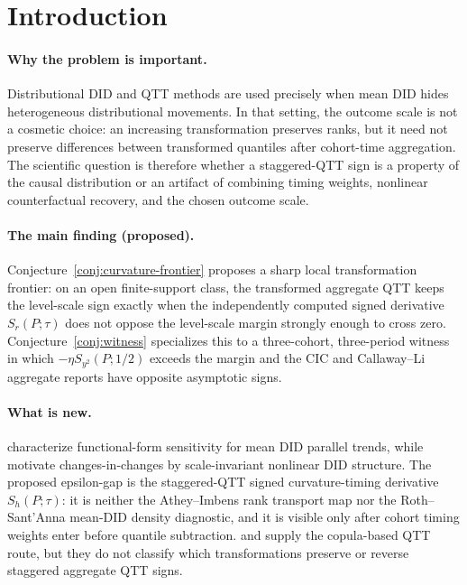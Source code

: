 \documentclass[11pt]{article}
\theoremstyle{definition}
\theoremstyle{plain}
\theoremstyle{remark}
\begin{document}
\section{Introduction}
\paragraph{Why the problem is important.}
Distributional DID and QTT methods are used precisely when mean DID hides
heterogeneous distributional movements.  In that setting, the outcome scale is not
a cosmetic choice: an increasing transformation preserves ranks, but it need not
preserve differences between transformed quantiles after cohort-time aggregation.
The scientific question is therefore whether a staggered-QTT sign is a property of
the causal distribution or an artifact of combining timing weights, nonlinear
counterfactual recovery, and the chosen outcome scale.

\paragraph{The main finding (proposed).}
Conjecture~\ref{conj:curvature-frontier} proposes a sharp local transformation
frontier: on an open finite-support class, the transformed aggregate QTT keeps
the level-scale sign exactly when the independently computed signed derivative
\(S_r(P;\tau)\) does not oppose the level-scale margin strongly enough to cross
zero.  Conjecture~\ref{conj:witness} specializes this to a three-cohort,
three-period witness in which \(-\eta S_{y^2}(P;1/2)\) exceeds the margin and the
CIC and Callaway--Li aggregate reports have opposite asymptotic signs.

\paragraph{What is new.}
\citet[pp.~738--741 and Proposition~1]{RothSantAnna2023} characterize
functional-form sensitivity for mean DID parallel trends, while
\citet{AtheyImbens2006} motivate changes-in-changes by
scale-invariant nonlinear DID structure.  The proposed epsilon-gap is the
staggered-QTT signed curvature-timing derivative \(S_h(P;\tau)\): it is neither the
Athey--Imbens rank transport map nor the Roth--Sant'Anna mean-DID density
diagnostic, and it is visible only after cohort timing weights enter before
quantile subtraction.  \citet[Section~2 and the discussion of time-invariance
copula challenges]{LiLin2024} and \citet[Assumption~3 and Theorem~1]{CallawayLi2019}
supply the copula-based QTT route, but they do not classify which transformations
preserve or reverse staggered aggregate QTT signs.
\end{document}
